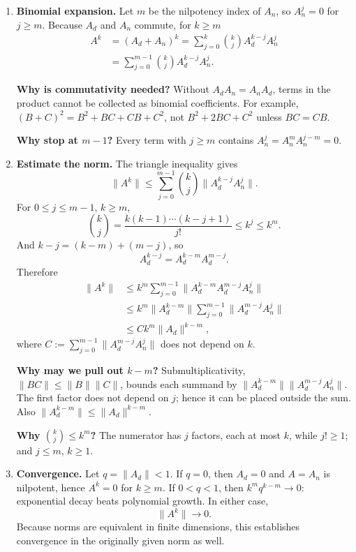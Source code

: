 \documentclass[11pt,a4paper]{article}
\newenvironment{proofsteps}{\begin{enumerate}\setlength{\itemsep}{4pt}}{\end{enumerate}}
\begin{document}
\begin{proofsteps}
\item \textbf{Binomial expansion.} Let \(m\) be the nilpotency index of \(A_n\), so \(A_n^j=0\) for \(j\geq m\). Because \(A_d\) and \(A_n\) commute, for \(k\geq m\)
\[
 \begin{aligned}
 A^k&=(A_d+A_n)^k
 =\sum_{j=0}^k\binom{k}{j}A_d^{k-j}A_n^j\\
 &=\sum_{j=0}^{m-1}\binom{k}{j}A_d^{k-j}A_n^j.
 \end{aligned}
\]
\begin{personalnote}
\textbf{Why is commutativity needed?} Without \(A_dA_n=A_nA_d\), terms in the product cannot be collected as binomial coefficients. For example, \((B+C)^2=B^2+BC+CB+C^2\), not \(B^2+2BC+C^2\) unless \(BC=CB\).

\textbf{Why stop at \(m-1\)?} Every term with \(j\geq m\) contains \(A_n^j=A_n^mA_n^{j-m}=0\).
\end{personalnote}

\item \textbf{Estimate the norm.} The triangle inequality gives
\[
 \|A^k\|
 \leq\sum_{j=0}^{m-1}\binom{k}{j}\|A_d^{k-j}A_n^j\|.
\]
For \(0\leq j\leq m-1\), \(k\geq m\),
\[
 \binom{k}{j}=\frac{k(k-1)\cdots(k-j+1)}{j!}
 \leq k^j\leq k^m.
\]
And \(k-j=(k-m)+(m-j)\), so
\[
 A_d^{k-j}=A_d^{k-m}A_d^{m-j}.
\]
Therefore
\[
 \begin{aligned}
 \|A^k\|
 &\leq k^m\sum_{j=0}^{m-1}\|A_d^{k-m}A_d^{m-j}A_n^j\|\\
 &\leq k^m\|A_d^{k-m}\|
       \sum_{j=0}^{m-1}\|A_d^{m-j}A_n^j\|\\
 &\leq Ck^m\|A_d\|^{k-m},
 \end{aligned}
\]
where
\(
 C:=\sum_{j=0}^{m-1}\|A_d^{m-j}A_n^j\|
\)
does not depend on \(k\).
\begin{personalnote}
\textbf{Why may we pull out \(k-m\)?} Submultiplicativity,
\(\|BC\|\leq\|B\|\|C\|\), bounds each summand by
\(\|A_d^{k-m}\|\|A_d^{m-j}A_n^j\|\).
The first factor does not depend on \(j\); hence it can be placed outside the sum. Also \(\|A_d^{k-m}\|\leq\|A_d\|^{k-m}\).

\textbf{Why \(\binom{k}{j}\leq k^m\)?} The numerator has \(j\) factors, each at most \(k\), while \(j!\geq1\); and \(j\leq m\), \(k\geq1\).
\end{personalnote}

\item \textbf{Convergence.} Let \(q=\|A_d\|<1\).
If \(q=0\), then \(A_d=0\) and \(A=A_n\) is nilpotent, hence \(A^k=0\) for \(k\geq m\).
If \(0<q<1\), then \(k^mq^{k-m}\to0\): exponential decay beats polynomial growth. In either case,
\[
 \boxed{\|A^k\|\longrightarrow0.}
\]
Because norms are equivalent in finite dimensions, this establishes convergence in the originally given norm as well.
\end{proofsteps}
\end{document}
